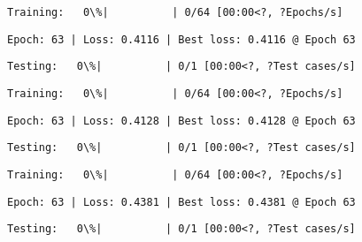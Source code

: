 \documentclass[11pt]{article}
\begin{document}
    
    
    \begin{Verbatim}[commandchars=\\\{\}]
Training:   0\%|          | 0/64 [00:00<?, ?Epochs/s]
    \end{Verbatim}

    
    \begin{Verbatim}[commandchars=\\\{\}]
Epoch: 63 | Loss: 0.4116 | Best loss: 0.4116 @ Epoch 63
    \end{Verbatim}

    
    \begin{Verbatim}[commandchars=\\\{\}]
Testing:   0\%|          | 0/1 [00:00<?, ?Test cases/s]
    \end{Verbatim}

    
    
    \begin{Verbatim}[commandchars=\\\{\}]
Training:   0\%|          | 0/64 [00:00<?, ?Epochs/s]
    \end{Verbatim}

    
    \begin{Verbatim}[commandchars=\\\{\}]
Epoch: 63 | Loss: 0.4128 | Best loss: 0.4128 @ Epoch 63
    \end{Verbatim}

    
    \begin{Verbatim}[commandchars=\\\{\}]
Testing:   0\%|          | 0/1 [00:00<?, ?Test cases/s]
    \end{Verbatim}

    
    
    \begin{Verbatim}[commandchars=\\\{\}]
Training:   0\%|          | 0/64 [00:00<?, ?Epochs/s]
    \end{Verbatim}

    
    \begin{Verbatim}[commandchars=\\\{\}]
Epoch: 63 | Loss: 0.4381 | Best loss: 0.4381 @ Epoch 63
    \end{Verbatim}

    
    \begin{Verbatim}[commandchars=\\\{\}]
Testing:   0\%|          | 0/1 [00:00<?, ?Test cases/s]
    \end{Verbatim}
\end{document}
